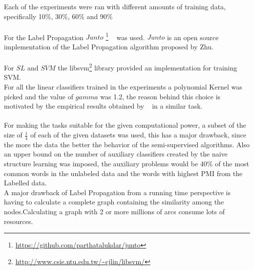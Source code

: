 \documentclass[4pt,a4paper,twocolumn]{article}
\begin{document}
Each of the experiments were ran with different amounts of training data, specifically 10\%, 30\%, 60\% and 90\%\\
\\
For the Label Propagation  $Junto$ \footnote{ \url{https://github.com/parthatalukdar/junto} } ~\cite{Talukdar:2010:EGS:1858681.1858830} was used. $Junto$ is an open source implementation of the Label Propagation algorithm proposed by Zhu.\\
\\
For $SL$ and $SVM$ the libsvm\footnote{\url{http://www.csie.ntu.edu.tw/~cjlin/libsvm/}} library provided an implementation for training SVM.\\
For all the linear classifiers trained in the experiments a  polynomial Kernel was picked and the value of $gamma$ was 1.2, the reason behind this choice is motivated by the empirical results obtained by ~\cite{Joachims:1998:TCS:645326.649721} in a similar task.\\
\\
For making the tasks suitable for the given computational power, a subset of the size of $\frac{1}{4}$ of each of the given datasets was used, this has a major drawback, since the more the data the better the behavior of the semi-supervised algorithms.
Also an upper bound on the number of auxiliary classifiers created by  the naive structure learning was imposed, the auxiliary problems would be 40\% of the most common words in the unlabeled data and the words with highest PMI from the Labelled data.\\
A major drawback of Label Propagation from a running time perspective is having to calculate a complete graph containing the similarity among the nodes.Calculating a graph with 2 or more millions of arcs consume lots of resources.
\end{document}
